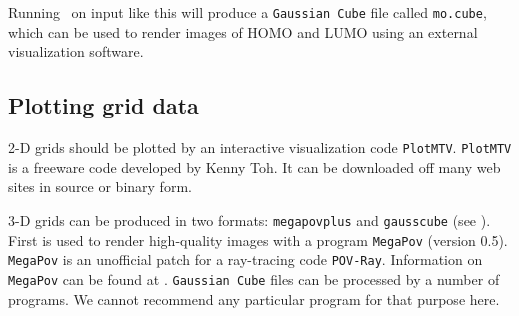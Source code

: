 Running \PSIthree\ on input like this will produce a {\tt Gaussian Cube}
file called {\tt mo.cube}, which can be used to render images of HOMO
and LUMO using
an external visualization software.

\subsection{Plotting grid data}
2-D grids should be plotted by an interactive visualization
code {\tt PlotMTV}. {\tt PlotMTV} is a freeware code
developed by Kenny Toh. It can be downloaded off many web sites in
source or binary form.

3-D grids can be produced in two formats: {\tt megapovplus}  and {\tt gausscube}
(see ).
First is used to render high-quality images with a program {\tt MegaPov} (version
0.5).  {\tt MegaPov} is an unofficial patch for a ray-tracing code
{\tt POV-Ray}. Information on {\tt MegaPov} can be found at
.
{\tt Gaussian Cube} files can be processed by a number of programs. We cannot recommend
any particular program for that purpose here.

